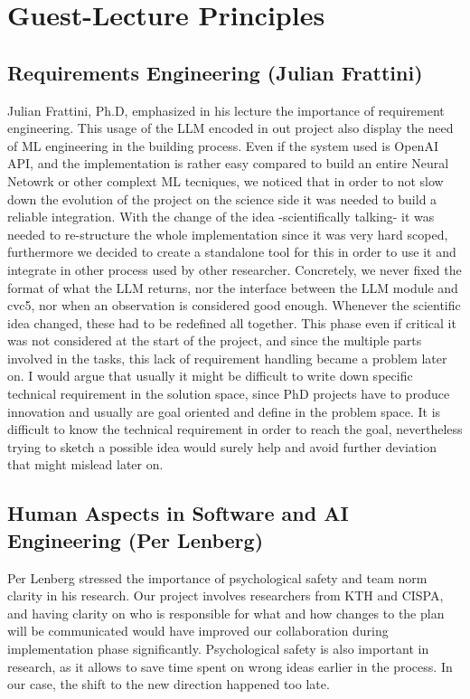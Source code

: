 \documentclass[11pt]{article}
\begin{document}
\section{Guest-Lecture Principles}
\subsection{Requirements Engineering (Julian Frattini)}
Julian Frattini, Ph.D, emphasized in his lecture the importance of requirement engineering. 
This usage of the LLM encoded in out project also display the need of ML engineering in the building process. Even if the system used is OpenAI API, and the implementation is rather easy compared to build an entire Neural Netowrk or other complext ML tecniques, we noticed that in order to not slow down the evolution of the project on the science side it was needed to build a reliable integration.
With the change of the idea -scientifically talking- it was needed to re-structure the whole implementation since it was very hard scoped, furthermore we decided to create a standalone tool for this in order to use it and integrate in other process used by other researcher.
Concretely, we never fixed the format of what the LLM returns, nor the interface between the LLM module and cvc5, nor when an observation is considered good enough. Whenever the scientific idea changed, these had to be redefined all together.
This phase even if critical it was not considered at the start of the project, and since the multiple parts involved in the tasks, this lack of requirement handling became a problem later on. 
I would argue that usually it might be difficult to write down specific technical requirement in the solution space, since PhD projects have to produce innovation and usually are goal oriented and define in the problem space. 
It is difficult to know the technical requirement in order to reach the goal, nevertheless trying to sketch a possible idea would surely help and avoid further deviation that might mislead later on.
\subsection{Human Aspects in Software and AI Engineering (Per Lenberg)}
Per Lenberg stressed the importance of psychological safety and team norm clarity in his research. Our project involves researchers from KTH and CISPA, and having clarity on who is responsible for what and how changes to the plan will be communicated would have improved our collaboration during implementation phase significantly. Psychological safety is also important in research, as it allows to save time spent on wrong ideas earlier in the process. In our case, the shift to the new direction happened too late.
\end{document}
